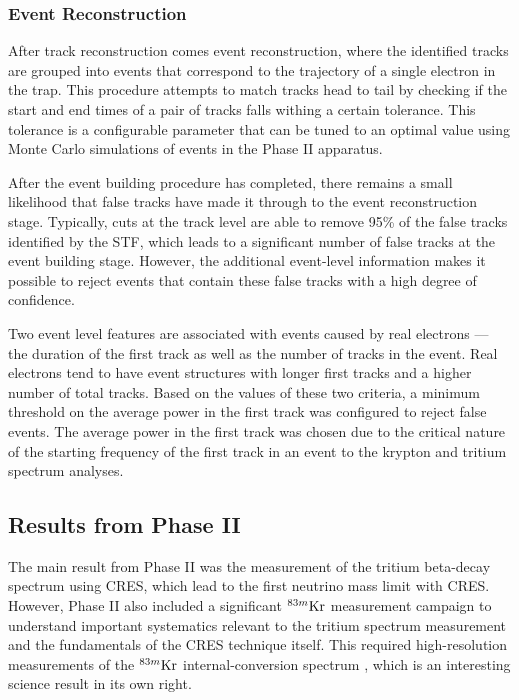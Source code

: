 \subsubsection*{Event Reconstruction}

After track reconstruction comes event reconstruction, where the identified tracks are grouped into events that correspond to the trajectory of a single electron in the trap. This procedure attempts to match tracks head to tail by checking if the start and end times of a pair of tracks falls withing a certain tolerance. This tolerance is a configurable parameter that can be tuned to an optimal value using Monte Carlo simulations of events in the Phase II apparatus.

After the event building procedure has completed, there remains a small likelihood that false tracks have made it through to the event reconstruction stage. Typically, cuts at the track level are able to remove 95\% of the false tracks identified by the STF, which leads to a significant number of false tracks at the event building stage. However, the additional event-level information makes it possible to reject events that contain these false tracks with a high degree of confidence. 

Two event level features are associated with events caused by real electrons --- the duration of the first track as well as the number of tracks in the event. Real electrons tend to have event structures with longer first tracks and a higher number of total tracks. Based on the values of these two criteria, a minimum threshold on the average power in the first track was configured to reject false events. The average power in the first track was chosen due to the critical nature of the starting frequency of the first track in an event to the krypton and tritium spectrum analyses.

\subsection{Results from Phase II}

The main result from Phase II was the measurement of the tritium beta-decay spectrum using CRES, which lead to the first neutrino mass limit with CRES. However, Phase II also included a significant $^{83m}\rm{Kr}$ measurement campaign to understand important systematics relevant to the tritium spectrum measurement and the fundamentals of the CRES technique itself. This required high-resolution measurements of the $^{83m}\rm{Kr}$ internal-conversion spectrum \cite{krypton83m}, which is an interesting science result in its own right.

